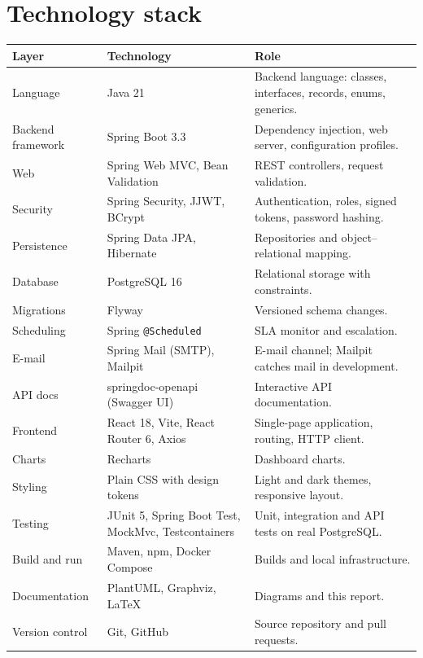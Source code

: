 \documentclass[11pt,a4paper]{article}
\begin{document}
\section{Technology stack}
\begin{longtable}{@{}p{3.2cm}p{4.4cm}p{8cm}@{}}
\toprule
\textbf{Layer} & \textbf{Technology} & \textbf{Role} \\ \midrule \endhead
Language & Java 21 & Backend language: classes, interfaces, records, enums, generics. \\
Backend framework & Spring Boot 3.3 & Dependency injection, web server, configuration profiles. \\
Web & Spring Web MVC, Bean Validation & REST controllers, request validation. \\
Security & Spring Security, JJWT, BCrypt & Authentication, roles, signed tokens, password hashing. \\
Persistence & Spring Data JPA, Hibernate & Repositories and object–relational mapping. \\
Database & PostgreSQL 16 & Relational storage with constraints. \\
Migrations & Flyway & Versioned schema changes. \\
Scheduling & Spring \texttt{@Scheduled} & SLA monitor and escalation. \\
E-mail & Spring Mail (SMTP), Mailpit & E-mail channel; Mailpit catches mail in development. \\
API docs & springdoc-openapi (Swagger UI) & Interactive API documentation. \\
Frontend & React 18, Vite, React Router 6, Axios & Single-page application, routing, HTTP client. \\
Charts & Recharts & Dashboard charts. \\
Styling & Plain CSS with design tokens & Light and dark themes, responsive layout. \\
Testing & JUnit 5, Spring Boot Test, MockMvc, Testcontainers & Unit, integration and API tests on real PostgreSQL. \\
Build and run & Maven, npm, Docker Compose & Builds and local infrastructure. \\
Documentation & PlantUML, Graphviz, LaTeX & Diagrams and this report. \\
Version control & Git, GitHub & Source repository and pull requests. \\ \bottomrule
\end{longtable}
\end{document}
